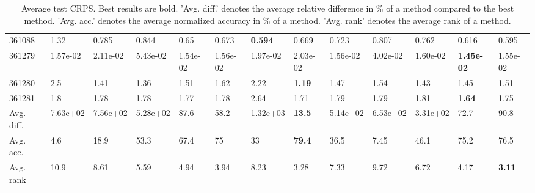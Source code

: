 \begin{table}[ht!]
\begin{tabular}{lllllllllllll}
  361088 & 1.32 & 0.785 & 0.844 & 0.65 & 0.673 & \textbf{0.594} & 0.669 & 0.723 & 0.807 & 0.762 & 0.616 & 0.595 \\ 
  361279 & 1.57e-02 & 2.11e-02 & 5.43e-02 & 1.54e-02 & 1.56e-02 & 1.97e-02 & 2.03e-02 & 1.56e-02 & 4.02e-02 & 1.60e-02 & \textbf{1.45e-02} & 1.55e-02 \\ 
  361280 & 2.5 & 1.41 & 1.36 & 1.51 & 1.62 & 2.22 & \textbf{1.19} & 1.47 & 1.54 & 1.43 & 1.45 & 1.51 \\ 
  361281 & 1.8 & 1.78 & 1.78 & 1.77 & 1.78 & 2.64 & 1.71 & 1.79 & 1.79 & 1.81 & \textbf{1.64} & 1.75 \\ 
   \hline
Avg. diff. & 7.63e+02 & 7.56e+02 & 5.28e+02 & 87.6 & 58.2 & 1.32e+03 & \textbf{13.5} & 5.14e+02 & 6.53e+02 & 3.31e+02 & 72.7 & 90.8 \\ 
  Avg. acc. & 4.6 & 18.9 & 53.3 & 67.4 & 75 & 33 & \textbf{79.4} & 36.5 & 7.45 & 46.1 & 75.2 & 76.5 \\ 
  Avg. rank & 10.9 & 8.61 & 5.59 & 4.94 & 3.94 & 8.23 & 3.28 & 7.33 & 9.72 & 6.72 & 4.17 & \textbf{3.11} \\ 
   \hline
\hline
\end{tabular}
\endgroup
\caption{Average test CRPS. 
                  Best results are bold. 
                  'Avg. diff.' denotes the average relative difference in \% of a method compared to the best method.
                  'Avg. acc.' denotes the average normalized accuracy in \% of a method.
                  'Avg. rank' denotes the average rank of a method.} 
\label{TABLES/table_results_CRPS_spatial_depth}
\end{table}
